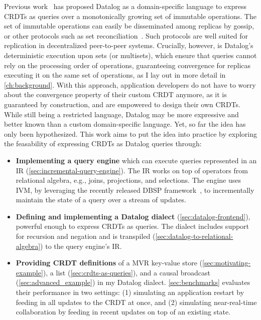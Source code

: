 Previous work~\cite{kleppmann2018data} has proposed Datalog as a domain-specific
language to express \acp{CRDT} as queries over a monotonically growing set of
immutable operations.
The set of immutable operations can easily be disseminated among replicas
by gossip, or other protocols such as set reconciliation~\cite{TODO}.
Such protocols are well suited for replication in decentralized peer-to-peer systems.
Crucially, however, is  Datalog's deterministic execution upon sets (or multisets),
which ensure that queries cannot rely on the processing order of operations,
guaranteeing convergence for replicas executing it on the same set of operations,
as I lay out in more detail in \autoref{ch:background}.
With this approach, application developers do not have to worry about
the convergence property of their custom \ac{CRDT} anymore,
as it is guaranteed by construction, and are empowered to design their own \acp{CRDT}.
While still being a restricted language, Datalog may be more expressive
and better known than a custom domain-specific language.
Yet, so far the idea has only been hypothesized.
This work aims to put the idea into practice by exploring the feasability of
expressing \acp{CRDT} as Datalog queries through:

\begin{itemize}
	\item \textbf{Implementing a query engine} which can execute queries
	      represented in an \ac{IR} (\ref{sec:incremental-query-engine}).
	      The \ac{IR} works on top of operators from relational algebra, e.g.,
	      joins, projections, and selections.
	      The engine uses \ac{IVM}, by leveraging the recently released DBSP
	      framework~\cite{budiu2025dbsp}, to incrementally maintain the state
	      of a query over a stream of updates.
	\item \textbf{Defining and implementing a Datalog dialect} (\ref{sec:datalog-frontend}),
	      powerful enough to express \acp{CRDT} as queries.
	      The dialect includes support for recursion and negation
	      and is transpiled (\ref{sec:datalog-to-relational-algebra})
	      to the query engine's \ac{IR}.
	\item \textbf{Providing \ac{CRDT} definitions} of
	      a \ac{MVR} key-value store (\ref{sec:motivating-example}),
	      a list (\ref{sec:crdts-as-queries}),
	      and a causal broadcast (\ref{sec:advanced_example}) in my Datalog dialect.
	      \ref{sec:benchmarks} evaluates their performance in two settings:
	      (1) simulating an application restart by feeding in all updates to
	      the \ac{CRDT} at once, and (2) simulating near-real-time collaboration
	      by feeding in recent updates on top of an existing state.
\end{itemize}

